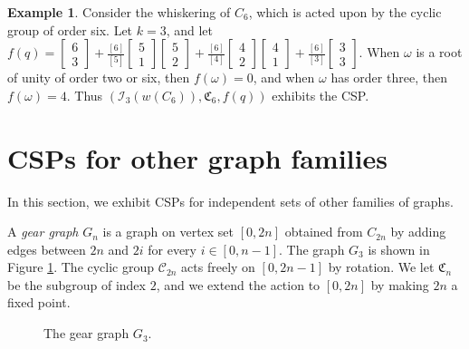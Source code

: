 \documentclass[12pt]{article}
\theoremstyle{definition}
\newtheorem{example}[theorem]{Example}
\newcommand{\gau}[2]{\left[ \begin{array}{c} #1 \\ #2 \end{array} \right]}
\begin{document}
\begin{example}
Consider the whiskering of $C_6$, which is acted upon by the cyclic group of order six. Let $k=3$, and let $f(q) = \gau{6}{3} + \frac{[6]}{[5]}\gau{5}{1}\gau{5}{2} + \frac{[6]}{[4]}\gau{4}{2}\gau{4}{1}+\frac{[6]}{[3]}\gau{3}{3}.$ When $\omega$ is a root of unity of order two or six, then $f(\omega) = 0$, and when $\omega$ has order three, then $f(\omega) = 4$. Thus $(\mathcal{I}_3(w(C_6)), \mathfrak{C}_6, f(q))$ exhibits the CSP.
\end{example}

\section{CSPs for other graph families}
\label{sec:more}

In this section, we exhibit CSPs for independent sets of other families of graphs.

A \emph{gear graph} $G_n$ is a graph on vertex set $[0,2n]$ obtained from $C_{2n}$ by adding edges between $2n$ and $2i$ for every $i \in [0,n-1].$ The graph $G_3$ is shown in Figure \ref{fig:gear}. The cyclic group $\mathcal{C}_{2n}$ acts freely on $[0,2n-1]$ by rotation. We let $\mathfrak{C}_n$ be the subgroup of index $2$, and we extend the action to $[0,2n]$ by making $2n$ a fixed point. 

\begin{figure}
\begin{center}
\caption{The gear graph $G_3$.}
\label{fig:gear}
\end{center}
\end{figure}
\end{document}

